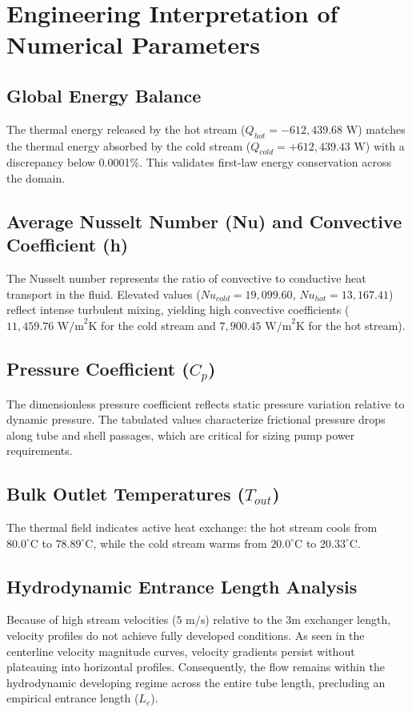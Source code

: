 \documentclass[12pt,a4paper]{report}
\begin{document}
\section{Engineering Interpretation of Numerical Parameters}

\subsection{Global Energy Balance}
The thermal energy released by the hot stream ($Q_{hot} = -612{,}439.68\text{ W}$) matches the thermal energy absorbed by the cold stream ($Q_{cold} = +612{,}439.43\text{ W}$) with a discrepancy below 0.0001\%. This validates first-law energy conservation across the domain.

\subsection{Average Nusselt Number (Nu) and Convective Coefficient (h)}
The Nusselt number represents the ratio of convective to conductive heat transport in the fluid. Elevated values ($Nu_{cold} = 19{,}099.60$, $Nu_{hot} = 13{,}167.41$) reflect intense turbulent mixing, yielding high convective coefficients ($11{,}459.76\text{ W/m}^2\text{K}$ for the cold stream and $7{,}900.45\text{ W/m}^2\text{K}$ for the hot stream).

\subsection{Pressure Coefficient ($C_p$)}
The dimensionless pressure coefficient reflects static pressure variation relative to dynamic pressure. The tabulated values characterize frictional pressure drops along tube and shell passages, which are critical for sizing pump power requirements.

\subsection{Bulk Outlet Temperatures ($T_{out}$)}
The thermal field indicates active heat exchange: the hot stream cools from $80.0^\circ\text{C}$ to $78.89^\circ\text{C}$, while the cold stream warms from $20.0^\circ\text{C}$ to $20.33^\circ\text{C}$.

\subsection{Hydrodynamic Entrance Length Analysis}
Because of high stream velocities ($5\text{ m/s}$) relative to the 3m exchanger length, velocity profiles do not achieve fully developed conditions. As seen in the centerline velocity magnitude curves, velocity gradients persist without plateauing into horizontal profiles. Consequently, the flow remains within the hydrodynamic developing regime across the entire tube length, precluding an empirical entrance length ($L_e$).
\end{document}
